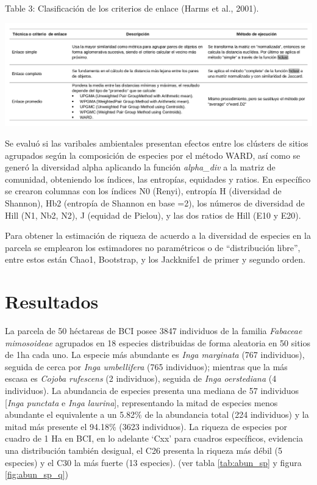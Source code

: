 \documentclass[11pt,]{article}
\begin{document}
Table 3: Clasificación de los criterios de enlace (Harms et al.,
2001).\label{tab:enlace}

\includegraphics[width=1.00000\textwidth]{Analisis/Diversidad/Tabla_Criterios_Enlace.png}
\textbar{}

Se evaluó si las varibales ambientales presentan efectos entre los
clústers de sitios agrupados según la composición de especies por el
método WARD, así como se generó la diversidad alpha aplicando la función
\emph{alpha\_div} a la matriz de comunidad, obteniendo los índices, las
entropías, equidades y ratios. En específico se crearon columnas con los
índices N0 (Renyi), entropía H (diversidad de Shannon), Hb2 (entropía de
Shannon en base =2), los números de diversidad de Hill (N1, Nb2, N2), J
(equidad de Pielou), y las dos ratios de Hill (E10 y E20).

Para obtener la estimación de riqueza de acuerdo a la diversidad de
especies en la parcela se emplearon los estimadores no paramétricos o de
``distribución libre'', entre estos están Chao1, Bootstrap, y los
Jackknife1 de primer y segundo orden.

\section{Resultados}\label{resultados}

La parcela de 50 héctareas de BCI posee 3847 individuos de la familia
\emph{Fabaceae mimosoideae} agrupados en 18 especies distribuidas de
forma aleatoria en 50 sitios de 1ha cada uno. La especie más abundante
es \emph{Inga marginata} (767 individuos), seguida de cerca por
\emph{Inga umbellifera} (765 individuos); mientras que la más escasa es
\emph{Cojoba rufescens} (2 individuos), seguida de \emph{Inga
oerstediana} (4 individuos). La abundancia de especies presenta una
mediana de 57 individuos {[}\emph{Inga punctata} e \emph{Inga
laurina}{]}, representando la mitad de especies menos abundante el
equivalente a un 5.82\% de la abundancia total (224 individuos) y la
mitad más presente el 94.18\% (3623 individuos). La riqueza de especies
por cuadro de 1 Ha en BCI, en lo adelante `Cxx' para cuadros
específicos, evidencia una distribución también desigual, el C26
presenta la riqueza más débil (5 especies) y el C30 la más fuerte (13
especies). (ver tabla \ref{tab:abun_sp} y figura \ref{fig:abun_sp_q})
\end{document}
